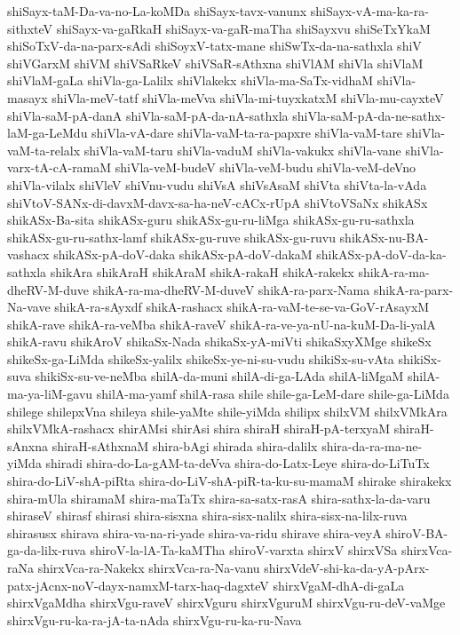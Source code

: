 {shiSayx-taM-Da-va-no-La-koMDa
shiSayx-tavx-vanunx
shiSayx-vA-ma-ka-ra-sithxteV
shiSayx-va-gaRkaH
shiSayx-va-gaR-maTha
shiSayxvu
shiSeTxYkaM
shiSoTxV-da-na-parx-sAdi
shiSoyxV-tatx-mane
shiSwTx-da-na-sathxla
shiV
shiVGarxM
shiVM
shiVSaRkeV
shiVSaR-sAthxna
shiVlAM
shiVla
shiVlaM
shiVlaM-gaLa
shiVla-ga-Lalilx
shiVlakekx
shiVla-ma-SaTx-vidhaM
shiVla-masayx
shiVla-meV-tatf
shiVla-meVva
shiVla-mi-tuyxkatxM
shiVla-mu-cayxteV
shiVla-saM-pA-danA
shiVla-saM-pA-da-nA-sathxla
shiVla-saM-pA-da-ne-sathx-laM-ga-LeMdu
shiVla-vA-dare
shiVla-vaM-ta-ra-papxre
shiVla-vaM-tare
shiVla-vaM-ta-relalx
shiVla-vaM-taru
shiVla-vaduM
shiVla-vakukx
shiVla-vane
shiVla-varx-tA-cA-ramaM
shiVla-veM-budeV
shiVla-veM-budu
shiVla-veM-deVno
shiVla-vilalx
shiVleV
shiVnu-vudu
shiVsA
shiVsAsaM
shiVta
shiVta-la-vAda
shiVtoV-SANx-di-davxM-davx-sa-ha-neV-cACx-rUpA
shiVtoVSaNx
shikASx
shikASx-Ba-sita
shikASx-guru
shikASx-gu-ru-liMga
shikASx-gu-ru-sathxla
shikASx-gu-ru-sathx-lamf
shikASx-gu-ruve
shikASx-gu-ruvu
shikASx-nu-BA-vashacx
shikASx-pA-doV-daka
shikASx-pA-doV-dakaM
shikASx-pA-doV-da-ka-sathxla
shikAra
shikAraH
shikAraM
shikA-rakaH
shikA-rakekx
shikA-ra-ma-dheRV-M-duve
shikA-ra-ma-dheRV-M-duveV
shikA-ra-parx-Nama
shikA-ra-parx-Na-vave
shikA-ra-sAyxdf
shikA-rashacx
shikA-ra-vaM-te-se-va-GoV-rAsayxM
shikA-rave
shikA-ra-veMba
shikA-raveV
shikA-ra-ve-ya-nU-na-kuM-Da-li-yalA
shikA-ravu
shikAroV
shikaSx-Nada
shikaSx-yA-miVti
shikaSxyXMge
shikeSx
shikeSx-ga-LiMda
shikeSx-yalilx
shikeSx-ye-ni-su-vudu
shikiSx-su-vAta
shikiSx-suva
shikiSx-su-ve-neMba
shilA-da-muni
shilA-di-ga-LAda
shilA-liMgaM
shilA-ma-ya-liM-gavu
shilA-ma-yamf
shilA-rasa
shile
shile-ga-LeM-dare
shile-ga-LiMda
shilege
shilepxVna
shileya
shile-yaMte
shile-yiMda
shilipx
shilxVM
shilxVMkAra
shilxVMkA-rashacx
shirAMsi
shirAsi
shira
shiraH
shiraH-pA-terxyaM
shiraH-sAnxna
shiraH-sAthxnaM
shira-bAgi
shirada
shira-dalilx
shira-da-ra-ma-ne-yiMda
shiradi
shira-do-La-gAM-ta-deVva
shira-do-Latx-Leye
shira-do-LiTuTx
shira-do-LiV-shA-piRta
shira-do-LiV-shA-piR-ta-ku-su-mamaM
shirake
shirakekx
shira-mUla
shiramaM
shira-maTaTx
shira-sa-satx-rasA
shira-sathx-la-da-varu
shiraseV
shirasf
shirasi
shira-sisxna
shira-sisx-nalilx
shira-sisx-na-lilx-ruva
shirasusx
shirava
shira-va-na-ri-yade
shira-va-ridu
shirave
shira-veyA
shiroV-BA-ga-da-lilx-ruva
shiroV-la-lA-Ta-kaMTha
shiroV-varxta
shirxV
shirxVSa
shirxVca-raNa
shirxVca-ra-Nakekx
shirxVca-ra-Na-vanu
shirxVdeV-shi-ka-da-yA-pArx-patx-jAcnx-noV-dayx-namxM-tarx-haq-dagxteV
shirxVgaM-dhA-di-gaLa
shirxVgaMdha
shirxVgu-raveV
shirxVguru
shirxVguruM
shirxVgu-ru-deV-vaMge
shirxVgu-ru-ka-ra-jA-ta-nAda
shirxVgu-ru-ka-ru-Nava
}
